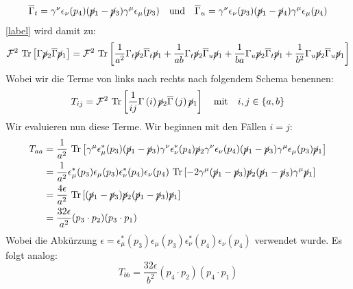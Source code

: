 \begin{equation}
			\overline{\Gamma}_t = \gamma^\nu \epsilon_\nu(p_4) (\cancel{p}_1- \cancel{p}_3)  \gamma^\mu \epsilon_\mu(p_3) \quad \text{und} \quad \overline{\Gamma}_u = \gamma^\nu \epsilon_\nu(p_3) (\cancel{p}_1- \cancel{p}_4)  \gamma^\mu \epsilon_\mu(p_4)
\end{equation}
\autoref{label} wird damit zu:
\begin{equation}
	\mathcal{F}^2~\text{Tr}\left[ \Gamma \cancel{p}_2 \overline{\Gamma} \cancel{p}_1 \right] = \mathcal{F}^2~\text{Tr}\left[\frac{1}{a^2} \Gamma_t \cancel{p}_2 \overline{\Gamma}_t \cancel{p}_1 + \frac{1}{ab} \Gamma_t \cancel{p}_2 \overline{\Gamma}_u \cancel{p}_1 + \frac{1}{ba} \Gamma_u \cancel{p}_2 \overline{\Gamma}_t \cancel{p}_1 + \frac{1}{b^2} \Gamma_u \cancel{p}_2 \overline{\Gamma}_u \cancel{p}_1\right]
\end{equation}
Wobei wir die Terme von links nach rechts nach folgendem Schema benennen:
\begin{equation}
	T_{ij} = \mathcal{F}^2~\text{Tr}\left[ \frac{1}{ij} \Gamma\left(i\right) \cancel{p}_2 \overline{\Gamma}\left(j\right) \cancel{p}_1 \right] \quad \text{mit} \quad i,j \in \left\lbrace a,b\right\rbrace
\end{equation}
Wir evaluieren nun diese Terme. Wir beginnen mit den Fällen $i = j$:
\begin{equation}
	\begin{aligned}
	T_{aa} &= \frac{1}{a^2}~\text{Tr}\left[ \gamma^\mu \epsilon^*_\mu(p_3) (\cancel{p}_1- \cancel{p}_3)  \gamma^\nu \epsilon_\nu^*(p_4) \cancel{p}_2 \gamma^\nu \epsilon_\nu(p_4) (\cancel{p}_1- \cancel{p}_3)  \gamma^\mu \epsilon_\mu(p_3) \cancel{p}_1 \right] \\
	&=\frac{1}{a^2} \epsilon^*_\mu(p_3)\epsilon_\mu(p_3)\epsilon_\nu^*(p_4)\epsilon_\nu(p_4) ~\text{Tr}\left[-2\gamma^\mu(\cancel{p}_1- \cancel{p}_3) \cancel{p}_2 (\cancel{p}_1- \cancel{p}_3)\gamma^\mu \cancel{p}_1\right] \\
	&=\frac{4\epsilon}{a^2}~\text{Tr}\left[(\cancel{p}_1- \cancel{p}_3) \cancel{p}_2 (\cancel{p}_1- \cancel{p}_3)\cancel{p}_1\right] \\
	&=\frac{32\epsilon}{a^2}(p_3\cdot p_2)(p_3\cdot p_1)
	\end{aligned}
\end{equation}
Wobei die Abkürzung $\epsilon = \epsilon^*_\mu(p_3)\epsilon_\mu(p_3)\epsilon_\nu^*(p_4)\epsilon_\nu(p_4)$ verwendet wurde. Es folgt analog:
\begin{equation}
	T_{bb} = \frac{32\epsilon}{b^2}(p_4\cdot p_2)(p_4\cdot p_1)
\end{equation}
